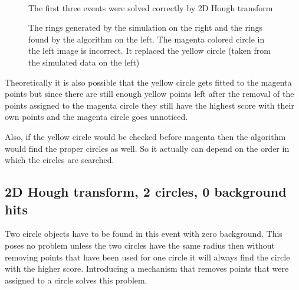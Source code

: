 \documentclass[11pt,twoside]{scrreprt}
\begin{document}
\begin{figure}[htp]
        \centering
        ~ %
        ~ %
              
        \caption{The first three events were solved correctly by 2D Hough transform}\label{fig:2D_HT_results1}

        \caption{The rings generated by the simulation on the right and the rings found by the algorithm on the left. The magenta 
        colored circle in the left image is incorrect. It replaced the yellow circle (taken from the simulated data on the left)}
        \label{fig:2d_6c_200_bg2}
\end{figure}

Theoretically it is also possible that the yellow circle gets fitted to the
magenta points but since there are still enough yellow points left after the removal 
of the points assigned to the magenta circle they still have the highest score with 
their own points and the magenta circle goes unnoticed.

Also, if the yellow circle would be checked before magenta then the algorithm
would find the proper circles as well. So it actually can depend on the order
in which the circles are searched.

\subsection{2D Hough transform, 2 circles, 0 background hits} %
\label{sub:2d_hough_transform_2_circles_0_background}
Two circle objects have to be found in this event with zero background. This
poses no problem unless the two circles have the same radius then without
removing points that have been used for one circle it will always find the 
circle with the higher score. Introducing a mechanism that removes points
that were assigned to a circle solves this problem.
\end{document}
